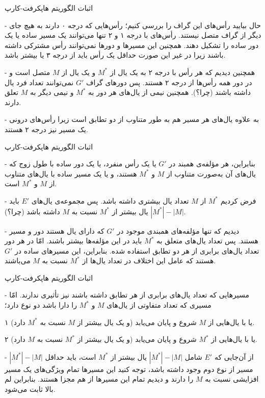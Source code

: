 \begin{itemframe}{اثبات الگوریتم هاپکرفت-کارپ}
\item[-]
حال بیایید رأس‌های این گراف را بررسی کنیم؛ رأس‌هایی که درجه ۰ دارند به هیچ جای دیگر از گراف متصل نیستند. رأس‌های با درجه ۱ و ۲ تنها می‌توانند یک مسیر ساده یا یک دور ساده را تشکیل دهند. همچنین این مسیرها و دور‌ها نمی‌توانند رأس مشترکی داشته باشند زیرا در غیر این صورت حداقل یک رأس باید از درجه ۳ یا بیشتر باشد.

\item[-]
همچنین دیدیم که هر رأس با درجه ۲ به یک یال از $M^*$ و یک یال از $M$ متصل است و در دور همه رأس‌ها از درجه ۲ هستند. پس دورهای گراف $G'$ نمی‌توانند تعداد فرد یال داشته باشند (چرا؟). همچنین نیمی از یال‌های هر دور به $M^*$ و نیمی دیگر به $M$ تعلق دارند.

\item[-]
به علاوه یال‌های هر مسیر هم به طور متناوب از دو تطابق است زیرا رأس‌های درونی یک مسیر نیز درجه ۲ هستند.

\end{itemframe}


\begin{itemframe}{اثبات الگوریتم هاپکرفت-کارپ}
\item[-]
بنابراین، هر مؤلفه‌ی همبند در $G'$ یا یک رأس منفرد، یا یک دور ساده با طول زوج که یال‌های آن به‌صورت متناوب از $M$ و $M^*$ هستند، و یا یک مسیر ساده با یال‌های متناوب از $M$ و $M^*$ است.

\item[-]
فرض کردیم  $M^*$ از $M$ تعداد یال بیشتری داشته باشد.
پس مجموعه‌ی یال‌های $E'$ باید $|M^*| - |M|$ یال بیشتر از $M^*$ نسبت به $M$ داشته باشد (چرا؟).
\item[-]
دیدیم که تنها مؤلفه‌های همبندی موجود در $G'$ که دارای یال ‌هستند دور و مسیر هستند. پس تعداد یال‌های متعلق به $M^*$ باید در این مؤلفه‌ها بیشتر باشند. امّا در هر دور تعداد یال‌های برابری از هر دو تطابق استفاده شده. بنابراین، این مسیرهای ساده در $G'$ هستند که عامل این اختلاف در تعداد یال‌ها از $M^*$ نسبت به $M$ می‌باشند.

\end{itemframe}


\begin{itemframe}{اثبات الگوریتم هاپکرفت-کارپ}
\item[-]
مسیرهایی که تعداد یال‌های برابری از هر تطابق داشته باشند نیز تأثیری ندارند. امّا مسیری که تعداد متفاوتی از یال‌های $M$ و $M^*$ را دارا باشد دو نوع دارد؛
\item[۱]
یا با یال‌هایی از $M$ شروع و پایان می‌یابد (و یک یال بیشتر از $M$ نسبت به $M^*$ دارد).
\item[۲]
یا با یال‌هایی از $M^*$ شروع و پایان می‌یابد (و یک یال بیشتر از $M^*$ نسبت به $M$ دارد).
\item[-]
از آن‌جایی که $E'$ شامل $|M^*| - |M|$ یال بیشتر از $M^*$ است، باید حداقل $|M^*| - |M|$ مسیر از نوع دوم وجود داشته باشد، توجه کنید این مسیرها تمام ویژگی‌های یک مسیر افزایشی نسبت به $M$ را دارند و دیدیم تمام این مسیرها از هم مجزا هستند. بنابراین لم بالا ثابت می‌شود.
\end{itemframe}


